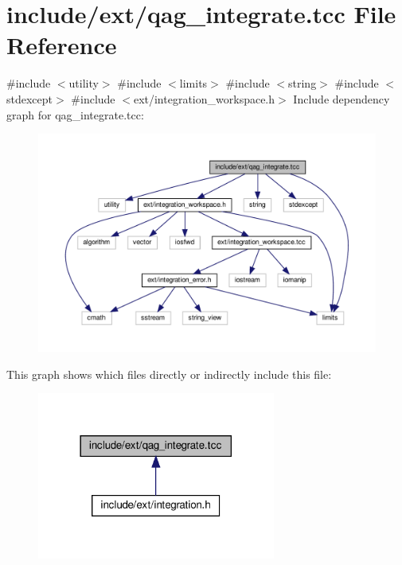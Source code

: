 \hypertarget{qag__integrate_8tcc}{}\section{include/ext/qag\+\_\+integrate.tcc File Reference}
\label{qag__integrate_8tcc}
{\ttfamily \#include $<$utility$>$}\newline
{\ttfamily \#include $<$limits$>$}\newline
{\ttfamily \#include $<$string$>$}\newline
{\ttfamily \#include $<$stdexcept$>$}\newline
{\ttfamily \#include $<$ext/integration\+\_\+workspace.\+h$>$}\newline
Include dependency graph for qag\+\_\+integrate.\+tcc\+:
\nopagebreak
\begin{figure}[H]
\begin{center}
\leavevmode
\includegraphics[width=350pt]{qag__integrate_8tcc__incl}
\end{center}
\end{figure}
This graph shows which files directly or indirectly include this file\+:
\nopagebreak
\begin{figure}[H]
\begin{center}
\leavevmode
\includegraphics[width=222pt]{qag__integrate_8tcc__dep__incl}
\end{center}
\end{figure}
